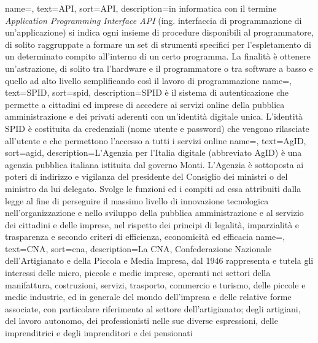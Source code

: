 
\renewcommand{\acronymname}{Acronimi e abbreviazioni}


\renewcommand{\glossaryname}{Glossario}

{
    name=,
    text=API,
    sort=API,
    description={in informatica con il termine \emph{Application Programming Interface API} (ing. interfaccia di programmazione di un'applicazione) si indica ogni insieme di procedure disponibili al programmatore, di solito raggruppate a formare un set di strumenti specifici per l'espletamento di un determinato compito all'interno di un certo programma. La finalità è ottenere un'astrazione, di solito tra l'hardware e il programmatore o tra software a basso e quello ad alto livello semplificando così il lavoro di programmazione}
}
{
	name=,
	text=SPID,
	sort=spid,
	description={SPID è il sistema di autenticazione che permette a cittadini ed imprese di accedere ai servizi online della pubblica amministrazione e dei privati aderenti con un’identità digitale unica. L’identità SPID è costituita da credenziali (nome utente e password) che vengono rilasciate all’utente e che permettono l’accesso a tutti i servizi online}
}
{
	name=,
	text=AgID,
	sort=agid,
	description={L'Agenzia per l'Italia digitale (abbreviato AgID) è una agenzia pubblica italiana istituita dal governo Monti. L'Agenzia è sottoposta ai poteri di indirizzo e vigilanza del presidente del Consiglio dei ministri o del ministro da lui delegato. Svolge le funzioni ed i compiti ad essa attribuiti dalla legge al fine di perseguire il massimo livello di innovazione tecnologica nell'organizzazione e nello sviluppo della pubblica amministrazione e al servizio dei cittadini e delle imprese, nel rispetto dei principi di legalità, imparzialità e trasparenza e secondo criteri di efficienza, economicità ed efficacia}
}
{
	name=,
	text=CNA,
	sort=cna,
	description={La CNA, Confederazione Nazionale dell'Artigianato e della Piccola e Media Impresa, dal 1946 rappresenta e tutela gli interessi delle micro, piccole e medie imprese, operanti nei settori della manifattura, costruzioni, servizi, trasporto, commercio e turismo, delle piccole e medie industrie, ed in generale del mondo dell’impresa e delle relative forme associate, con particolare riferimento al settore dell’artigianato; degli artigiani, del lavoro autonomo, dei professionisti  nelle sue diverse espressioni, delle imprenditrici e degli imprenditori e dei pensionati}
}
